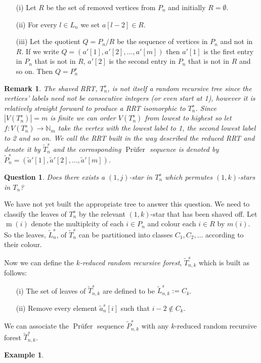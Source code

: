 \documentclass[10pt]{article} %
\newtheorem{remk}{Remark}
\newtheorem{ques}{Question}
\theoremstyle{definition}
\newtheorem{ex}[thm]{Example}
\DeclareMathOperator{\p}{\text{Pr\"{u}fer}}
\DeclareMathOperator{\m}{m}
\begin{document}
\begin{itemize}
 \item[(i)] Let $R$  be the set of removed vertices from $P_n$ and initially  $R  = \emptyset$.
 \item[(ii)] For every $l \in L_n$ we set $a[l - 2] \in R$.
 \item[(iii)] Let the quotient $ Q = P_n / R$ be the sequence of vertices in $P_n$ and not in $R$.  If we write $Q = (a'[1],a'[2],\dots,a'[m])$ then $a'[1]$ is the first entry in $P_n$ that is not in $R$, $a'[2]$ is the second entry in $P_n$ that is not in $R$ and so on. Then $Q =  P_n^s$
\end{itemize}

\begin{remk}
 The shaved RRT, $T^s_n$, is \emph{not} itself a random recursive tree since the vertices' labels need not be consecutive integers (or even start at 1), however it is relatively straight forward to produce a RRT isomorphic to $T^s_n$. Since $|V(T^s_n)| =  m$ is finite we can order $V(T^s_n)$ from lowest to highest so let $f: V(T^s_n) \rightarrow \mathbb{N}_m$ take the vertex with the lowest label to 1, the second lowest label to 2 and so on.  We call the RRT built in the way described the \emph{reduced RRT} and denote it by $\tilde{T}^s_n$ and the corrosponding $\p$ sequence is denoted by $\tilde{P}_n^s = (\tilde{a}'[1],\tilde{a}'[2],\dots,\tilde{a}'[m])$.
 \end{remk}                            

\begin{ques} Does there exists a $(1,j)$-star in $T^s_n$ which permutes $(1,k)$-stars in $T_n$?
 
\end{ques}
 We have not yet built the appropriate tree to answer this question. We need to classify the leaves of $T^s_n$ by the relevant $(1,k)$-star that has been shaved off.  Let $\m(i)$ denote the multiplcity of each $i \in P_n$ and colour each $i \in R$ by $m(i)$. So the leaves, $\tilde{L}_n^s$, of $\tilde{T}^s_n$ can be partitioned into classes $C_1,C_2,\dots$ according to their colour. 

Now we can define the \emph{$k$-reduced random recursive forest}, $\tilde{T}^s_{n,k}$ which is built as follows:
\begin{itemize}
 \item[(i)] The set of leaves of  $\tilde{T}^s_{n,k}$ are defined to be  $\tilde{L}_{n,k}^s := C_k$.
 \item[(ii)] Remove every element $\tilde{a}^s_n[i]$ such that $i-2 \notin  C_k$. 
\end{itemize}

We can associate the $\p$ sequence $\tilde{P}_{n,k}^s$ with any $k$-reduced random recursive forest $\tilde{T}^s_{n,k}$.



\begin{ex}
\end{ex}



\end{document}

